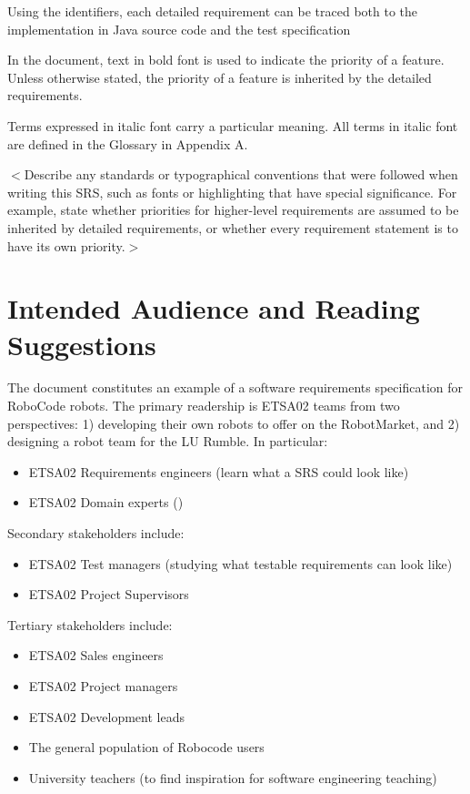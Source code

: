 \documentclass{scrreprt}
\begin{document}
Using the identifiers, each detailed requirement can be traced both to the implementation in Java source code and the test specification

In the document, text in bold font is used to indicate the priority of a feature. Unless otherwise stated, the priority of a feature is inherited by the detailed requirements. 

Terms expressed in italic font carry a particular meaning. All terms in italic font are defined in the Glossary in Appendix A. 

$<$Describe any standards or typographical conventions that were followed when 
writing this SRS, such as fonts or highlighting that have special significance.  
For example, state whether priorities  for higher-level requirements are assumed 
to be inherited by detailed requirements, or whether every requirement statement 
is to have its own priority.$>$

\section{Intended Audience and Reading Suggestions}
The document constitutes an example of a software requirements specification for RoboCode robots. The primary readership is ETSA02 teams from two perspectives: 1) developing their own robots to offer on the RobotMarket, and 2) designing a robot team for the LU Rumble. In particular:

\begin{itemize}
\item ETSA02 Requirements engineers (learn what a SRS could look like)
\item ETSA02 Domain experts ()
\end{itemize}

Secondary stakeholders include:
\begin{itemize}
\item ETSA02 Test managers (studying what testable requirements can look like)
\item ETSA02 Project Supervisors
\end{itemize}

Tertiary stakeholders include:
\begin{itemize}
\item ETSA02 Sales engineers
\item ETSA02 Project managers
\item ETSA02 Development leads
\item The general population of Robocode users
\item University teachers (to find inspiration for software engineering teaching)
\end{itemize}
\end{document}
